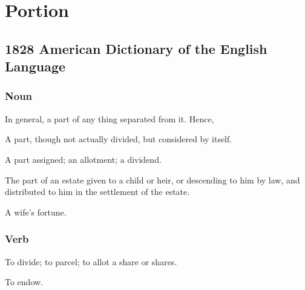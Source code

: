 \section{Portion}
	\label{PORTION}
	

\subsection{1828 American Dictionary of the English Language} %
	\label{PORTION-1828}
	
	\subsubsection{Noun}

		\begin{compactitem}
			\item[1] In general, a part of any thing separated from it. Hence,
			\item[2] A part, though not actually divided, but considered by itself.
			\item[3] A part assigned; an allotment; a dividend.
			\item[4] The part of an estate given to a child or heir, or descending to him by law, and distributed to him in the settlement of the estate.
			\item[5] A wife's fortune.
		\end{compactitem}
		
	\subsubsection{Verb}
	
		\begin{compactitem}
			\item To divide; to parcel; to allot a share or shares.
			\item[1] To endow.
		\end{compactitem}


